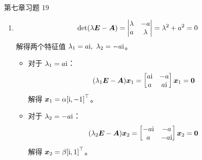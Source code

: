 \begin{problem}
	第七章习题 19

	\begin{solution}
		\begin{enumerate}
			\item[\textbf{2)}]
			$$
			\det(\lambda \boldsymbol{E} - \boldsymbol{A}) = \begin{vmatrix}
				\lambda & -a \\
				a & \lambda
			\end{vmatrix} = \lambda^2 + a^2 = 0
			$$
			解得两个特征值 $\lambda_1 = a \mathrm{i},\ \lambda_2 = -a \mathrm{i}$。
			
			\begin{itemize}
				\item 对于 $\lambda_1 = a \mathrm{i}$：
				$$
				(\lambda_1 \boldsymbol{E} - \boldsymbol{A}) \boldsymbol{x}_1 = \begin{bmatrix}
					a \mathrm{i} & -a \\
					a & a \mathrm{i}
				\end{bmatrix} \boldsymbol{x}_1 = \boldsymbol{0}
				$$
				解得 $\boldsymbol{x}_1 = \alpha {[\mathrm{i}, -1]}^\top$。

				\item 对于 $\lambda_2 = -a \mathrm{i}$：
				$$
				(\lambda_2 \boldsymbol{E} - \boldsymbol{A}) \boldsymbol{x}_2 = \begin{bmatrix}
					-a \mathrm{i} & -a \\
					a & -a \mathrm{i}
				\end{bmatrix} \boldsymbol{x}_2 = \boldsymbol{0}
				$$
				解得 $\boldsymbol{x}_2 = \beta {[\mathrm{i}, 1]}^\top$。
			\end{itemize}


\end{enumerate}
\end{solution}
\end{problem}

